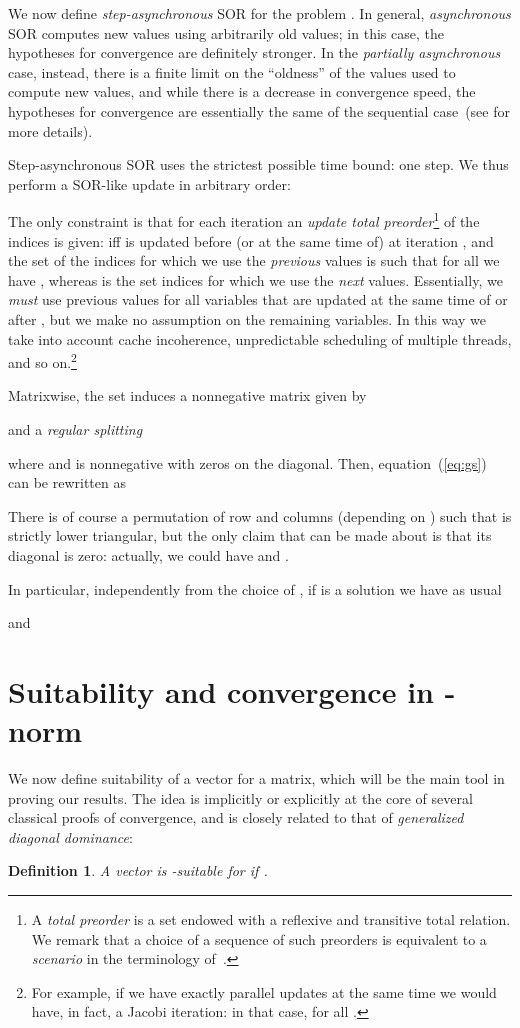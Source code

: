 \documentclass{article}
\newcommand{\1}{\mathbf 1}
\newtheorem{definition}{Definition}
\begin{document}
We now define \emph{step-asynchronous} SOR for the problem .
In general, \emph{asynchronous} SOR computes new values using arbitrarily old values; in this case, the hypotheses for convergence
are definitely stronger. In the 
\emph{partially asynchronous} case, instead, there is a 
finite limit on the ``oldness'' of the values used to compute new values, and while there is a decrease
in convergence speed, the hypotheses for convergence are essentially the same of
the sequential case~(see \cite{BeTPDCNM} for more details).

Step-asynchronous SOR uses the strictest possible time bound: one step. We thus perform a SOR-like update in arbitrary order:

The only constraint 
is that for each iteration an \emph{update total preorder}\footnote{A \emph{total preorder} is a 
set endowed with a reflexive and transitive total relation. We remark that a choice of a sequence
of such preorders is equivalent to a \emph{scenario} in the terminology of~\cite{BeTPDCNM}.}  of
the indices is given:  iff  is updated before (or at the
same time of)  at iteration , and the set
 of the indices for which we use the \emph{previous}
values is such that for all  we have , whereas
 is the set indices for which we use the \emph{next}
values. Essentially,
we \emph{must} use previous values for all variables that are updated at the
same time of  or after , but we make no assumption on the remaining
variables. In this way we take into account cache incoherence, unpredictable
scheduling of multiple threads, and so on.\footnote{For example, if we have
exactly  parallel updates at the same time we would have, in fact, a Jacobi
iteration: in that case,  for all .}

Matrixwise, the set  induces a nonnegative
matrix  given by

and a \emph{regular splitting}

where  and  is nonnegative with zeros on the diagonal.
Then, equation~(\ref{eq:gs}) can be rewritten as

There is of course a permutation of row and columns (depending on ) such that 
 is strictly lower triangular, but the only claim that can be made
about  is that its diagonal is zero: actually, we could have
 and .

In particular, independently from the choice of , if  is a
solution we have as usual

and


\section{Suitability and convergence in -norm}
We now define suitability of a vector for a matrix, which will be the main tool in
proving our results. The idea is implicitly or explicitly at the core of several
classical proofs of convergence, and is closely related to that of \emph{generalized diagonal dominance}:
\begin{definition}
A vector  is \emph{-suitable} for  if
.
\end{definition}
\end{document}
